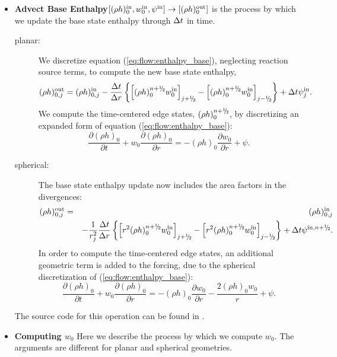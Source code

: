 \begin{itemize}
\item {\bf Advect Base Enthalpy}$[(\rho h)_0^{\mathrm{in}},w_0^{\mathrm{in}},\psi^{\mathrm{in}}] \rightarrow [(\rho h)_0^{\mathrm{out}}]$
  is the process by which we update the base state enthalpy through $\Delta t$ in time.  
\begin{description}
\item[planar:] We discretize equation (\ref{eq:flow:enthalpy_base}), neglecting reaction 
source terms, to compute the new base state enthalpy,
\begin{equation}
(\rho h)_{0,j}^{\outp} = (\rho h)_{0,j}^{\inp} - \frac{\dt}{\Delta r} \left\{ \left[ (\rho h)_0^{\nph} w_0^{\inp}\right]_{j+\myhalf} - \left[ (\rho h)_0^{\nph} w_0^{\inp}\right]_{j-\myhalf} \right\} + \dt\psi_j^{\inp}.
\end{equation}
  We compute the time-centered edge states, $(\rho h)_0^{\nph}$, by discretizing
  an expanded form of equation (\ref{eq:flow:enthalpy_base}):
\begin{equation}
\frac{\partial (\rho h)_0}{\partial t} + w_0 \frac{\partial (\rho h)_0}{\partial r} = -(\rho h)_0 \frac{\partial w_0}{\partial r} + \psi.
\end{equation}
\item[spherical:]  The base state enthalpy update now includes the area factors 
  in the divergences:
\begin{eqnarray}
(\rho h)_{0,j}^{\outp} &=& (\rho h)_{0,j}^{\inp} \nonumber \\
&& - \frac{1}{r_j^2} \frac{\dt}{\dr} \left \{ \left[ r^2 (\rho h)_0^{\nph} w_0^{\inp}\right]_{j+\myhalf} - \left[ r^2 (\rho h)_0^{\nph} w_0^{\inp}\right]_{j-\myhalf} \right\} +\dt\psi^{\inp,\nph}.\nonumber\\
\end{eqnarray}
  In order to compute the time-centered edge states, an additional geometric 
  term is added to the forcing, due to the spherical discretization of 
  (\ref{eq:flow:enthalpy_base}):
\begin{equation}
\frac{\partial (\rho h)_0}{\partial t} + w_0 \frac{\partial (\rho h)_0}{\partial r} = -(\rho h)_0 \frac{\partial w_0}{\partial r} - \frac{2 (\rho h)_0 w_0}{r} + \psi.
\end{equation}
\end{description}

The source code for this operation can be found in . 


\item {\bf Computing {\boldmath $w_0$}}\label{Sec:Computing w0}
Here we describe the process by which we compute $w_0$.  The arguments 
are different for planar and spherical geometries.
\begin{description}


\end{description}
\end{itemize}
